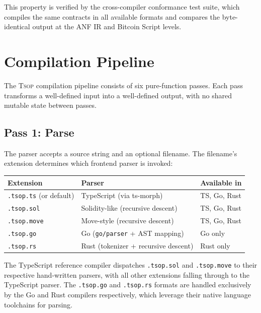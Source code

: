 \documentclass[11pt,a4paper]{article}
\newcommand{\tsop}{\textsc{Tsop}}
\begin{document}
This property is verified by the cross-compiler conformance test suite,
which compiles the same contracts in all available formats and compares
the byte-identical output at the ANF IR and Bitcoin Script levels.

\section{Compilation Pipeline}
\label{sec:pipeline}

The \tsop{} compilation pipeline consists of six pure-function passes.
Each pass transforms a well-defined input into a well-defined output,
with no shared mutable state between passes.

\subsection{Pass 1: Parse}
\label{sec:pass-parse}

The parser accepts a source string and an optional filename. The filename's
extension determines which frontend parser is invoked:

\begin{center}
\small
\begin{tabular}{@{}lll@{}}
\toprule
\textbf{Extension} & \textbf{Parser} & \textbf{Available in} \\
\midrule
\texttt{.tsop.ts} (or default) & TypeScript (via ts-morph) & TS, Go, Rust \\
\texttt{.tsop.sol} & Solidity-like (recursive descent) & TS, Go, Rust \\
\texttt{.tsop.move} & Move-style (recursive descent) & TS, Go, Rust \\
\texttt{.tsop.go} & Go (\texttt{go/parser} + AST mapping) & Go only \\
\texttt{.tsop.rs} & Rust (tokenizer + recursive descent) & Rust only \\
\bottomrule
\end{tabular}
\end{center}

The TypeScript reference compiler dispatches \texttt{.tsop.sol} and
\texttt{.tsop.move} to their respective hand-written parsers, with all
other extensions falling through to the TypeScript parser. The
\texttt{.tsop.go} and \texttt{.tsop.rs} formats are handled exclusively
by the Go and Rust compilers respectively, which leverage their native
language toolchains for parsing.
\end{document}
